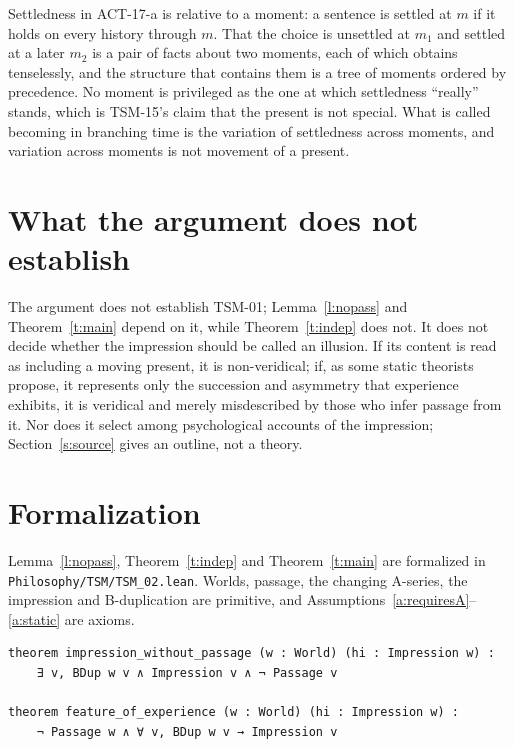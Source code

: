\documentclass{situationist-preprint}
\begin{document}
\begin{reply}
Settledness in ACT-17-a is relative to a moment: a sentence is settled at $m$ if it holds on every history through $m$. That the choice is unsettled at $m_1$ and settled at a later $m_2$ is a pair of facts about two moments, each of which obtains tenselessly, and the structure that contains them is a tree of moments ordered by precedence. No moment is privileged as the one at which settledness \enquote{really} stands, which is TSM-15's claim that the present is not special. What is called becoming in branching time is the variation of settledness across moments, and variation across moments is not movement of a present.
\end{reply}

\section{What the argument does not establish}

The argument does not establish TSM-01; Lemma~\ref{l:nopass} and Theorem~\ref{t:main} depend on it, while Theorem~\ref{t:indep} does not. It does not decide whether the impression should be called an illusion. If its content is read as including a moving present, it is non-veridical; if, as some static theorists propose, it represents only the succession and asymmetry that experience exhibits, it is veridical and merely misdescribed by those who infer passage from it. Nor does it select among psychological accounts of the impression; Section~\ref{s:source} gives an outline, not a theory.

\section{Formalization}

Lemma~\ref{l:nopass}, Theorem~\ref{t:indep} and Theorem~\ref{t:main} are formalized in \nolinkurl{Philosophy/TSM/TSM_02.lean}. Worlds, passage, the changing A-series, the impression and B-duplication are primitive, and Assumptions~\ref{a:requiresA}--\ref{a:static} are axioms.

\begin{lstlisting}
theorem impression_without_passage (w : World) (hi : Impression w) :
    ∃ v, BDup w v ∧ Impression v ∧ ¬ Passage v

theorem feature_of_experience (w : World) (hi : Impression w) :
    ¬ Passage w ∧ ∀ v, BDup w v → Impression v
\end{lstlisting}
\end{document}
